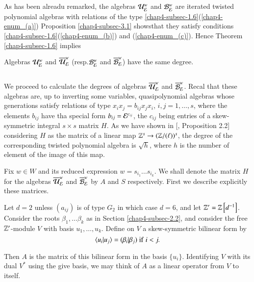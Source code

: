 As has been alreadu remarked, the algebras $\mathcal{U}_{\mathcal{E}}^{w}$ and $\mathcal{B}_{\mathcal{E}}^{w}$ are iterated twisted polynomial algebras with relations of the type \ref{chap4-subsec-1.6}(\ref{chap4-enum_(a)}) Proposition \ref{chap4-subsec-3.1} shows\pageoriginale that they satisfy conditions \ref{chap4-subsec-1.6}(\ref{chap4-enum_(b)}) and (\ref{chap4-enum_(c)}). Hence Theorem \ref{chap4-subsec-1.6} implies

\begin{coro*}
Algebras $\mathcal{U}_{\mathcal{E}}^{w}$ and $\overline{\mathcal{U}}_{\mathcal{E}}^{w}$ (resp.$\mathcal{B}_{\mathcal{E}}^{w}$ and $\overline{\mathcal{B}}_{\mathcal{E}}^{w}$) have the same degree.
\end{coro*}

\subsection{}\label{chap4-subsec-3.2}
We proceed to calculate the degrees of algebras $\overline{\mathcal{U}}_{\mathcal{E}}^{w}$ and $\overline{\mathcal{B}}_{\mathcal{E}}^{w}$. Recal that these algebras are, up to inverting some variables, quasipolynomial algebras whose generations satisfy relations of type $x_{i}x_{j} = b_{ij}x_{j}x_{i}$, $i,j = 1, \ldots, s$, where the elements $b_{ij}$ have tha special form $b_{ij}= \mathcal{E}^{c_{ij}}$, the $c_{ij}$ being entries of a skew-symmetric integral $s \times s$ matrix $H$. As we have shown in
[\cite{chap4-keyDKP2}, Proposition 2.2] considering $H$ as the matrix of a linear map $\mathbb{Z}^{s} \rightarrow (\mathbb{Z}/(\ell))^{s}$, the degree of the corresponding twisted polynomial algebra is $\sqrt{h}$, where $h$ is the number of element of the image of this map.

Fix $w \in W$ and its reduced expression $w = s_{i_{1}}\ldots s_{i_{k}}$. We shall denote the matrix $H$ for the algebras $\overline{\mathcal{U}}_{\mathcal{E}}^{w}$ and $\overline{\mathcal{B}}_{\mathcal{E}}^{w}$ by $A$ and $S$ respectively. First we describe explicitly these matrices.

Let $d=2$ unless $(a_{ij})$ is of type $G_{2}$ in which case $d=6$, and let $\mathbb{Z}' = \mathbb{Z}\left[d^{-1}\right]$. Consider the roots $\beta_{1}, \ldots \beta_{k}$ as in Section \ref{chap4-subsec-2.2}, and consider the free $\mathbb{Z}'$-module $V$ with basis $u_{1}, \ldots, u_{k}$. Define on $V$ a skew-symmetric bilinear form by
$$
\langle u_{i} | u_{j}\rangle = (\beta_{i} | \beta_{j})\; {\rm if} \; i < j.
$$

\noindent
Then $A$ is the matrix of this bilinear form in the basis $\{u_{i}\}$. Identifying $V$ with its dual $V^{*}$ using the give basis, we may think of $A$ as a linear operator from $V$ to itself.

